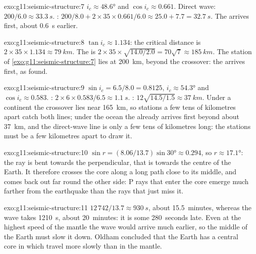 \begin{solution}{exo:g11:seismic-structure:7}
$i_c \approx \ang{48.6}$ and $\cos i_c \approx 0.661$. Direct wave: $200/6.0
\approx \qty{33.3}{s}$. : $200/8.0 + 2 \times 35 \times 0.661/6.0
\approx 25.0 + 7.7 = \qty{32.7}{s}$. The  arrives first, about
\qty{0.6}{s} earlier.
\end{solution}

\begin{solution}{exo:g11:seismic-structure:8}
$\tan i_c \approx 1.134$: the critical distance is $2 \times 35 \times 1.134
\approx \qty{79}{km}$. The  is $2 \times 35 \times
\sqrt{14.0/2.0} = 70\sqrt 7 \approx \qty{185}{km}$. The station of
\cref{exo:g11:seismic-structure:7} lies at \qty{200}{km}, beyond the
crossover: the  arrives first, as found.
\end{solution}

\begin{solution}{exo:g11:seismic-structure:9}
$\sin i_c = 6.5/8.0 = 0.8125$, $i_c \approx \ang{54.3}$ and $\cos i_c \approx
0.583$. : $2 \times 6 \times 0.583/6.5 \approx \qty{1.1}{s}$.
: $12\sqrt{14.5/1.5} \approx \qty{37}{km}$. Under a
continent the crossover lies near \qty{165}{km}, so stations a few tens of
kilometres apart catch both lines; under the ocean the  already
arrives first beyond about \qty{37}{km}, and the direct-wave line is only a
few tens of kilometres long: the stations must be a few kilometres apart to
draw it.
\end{solution}

\begin{solution}{exo:g11:seismic-structure:10}
$\sin r = (8.06/13.7)\sin\ang{30} \approx 0.294$, so $r \approx \ang{17.1}$:
the ray is bent towards the perpendicular, that is towards the centre of the
Earth. It therefore crosses the core along a long path close to its middle,
and comes back out far round the other side: P rays that enter the core
emerge much farther from the earthquake than the rays that just miss it.
\end{solution}

\begin{solution}{exo:g11:seismic-structure:11}
$12\,742/13.7 \approx \qty{930}{s}$, about 15.5~minutes, whereas the wave
takes \qty{1210}{s}, about 20~minutes: it is some 280~seconds late. Even at
the highest speed of the mantle the wave would arrive much earlier, so the
middle of the Earth must slow it down. Oldham concluded that the Earth has a
central core in which  travel more slowly than in the mantle.
\end{solution}

